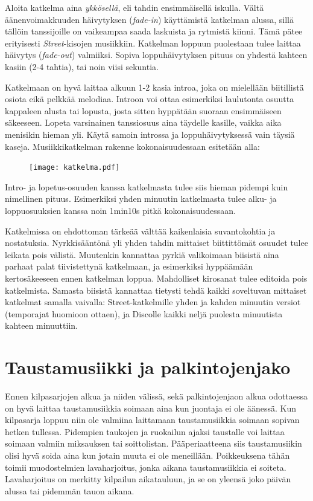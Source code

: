 \documentclass[12pt, a4paper, oneside]{article}
\begin{document}
Aloita katkelma aina \textit{ykkösellä}, eli tahdin ensimmäisellä iskulla.
Vältä äänenvoimakkuuden häivytyksen (\textit{fade-in}) käyttämistä katkelman alussa,
sillä tällöin tanssijoille on vaikeampaa saada laskuista ja rytmistä kiinni.
Tämä pätee erityisesti \textit{Street}-kisojen musiikkiin.
Katkelman loppuun puolestaan tulee laittaa häivytys (\textit{fade-out}) valmiiksi.
Sopiva loppuhäivytyksen pituus on yhdestä kahteen kasiin (2-4 tahtia),
tai noin viisi sekuntia.

Katkelmaan on hyvä laittaa alkuun 1-2 kasia introa,
joka on mielellään biitillistä osiota eikä pelkkää melodiaa.
Introon voi ottaa esimerkiksi laulutonta osuutta kappaleen alusta tai lopusta,
josta sitten hyppätään suoraan ensimmäiseen säkeeseen.
Lopeta varsinainen tanssiosuus aina täydelle kasille,
vaikka aika menisikin hieman yli.
Käytä samoin introssa ja loppuhäivytyksessä vain täysiä kaseja.
Musiikkikatkelman rakenne kokonaisuudessaan esitetään alla: \\

\begin{figure}[ht]
    \centering
    \texttt{[image: katkelma.pdf]}
\end{figure}

Intro- ja lopetus-osuuden kanssa katkelmasta tulee siis hieman pidempi kuin nimellinen pituus.
Esimerkiksi yhden minuutin katkelmasta tulee alku- ja loppuosuuksien kanssa noin 1min10s pitkä kokonaisuudessaan.

Katkelmissa on ehdottoman tärkeää välttää kaikenlaisia suvantokohtia ja nostatuksia.
Nyrkkisääntönä yli yhden tahdin mittaiset biittittömät osuudet tulee leikata pois välistä.
Muutenkin kannattaa pyrkiä valikoimaan biisistä aina parhaat palat tiivistettynä katkelmaan,
ja esimerkiksi hyppäämään kertosäkeeseen ennen katkelman loppua.
Mahdolliset kirosanat tulee editoida pois katkelmista.
Samasta biisistä kannattaa tietysti tehdä kaikki soveltuvan mittaiset katkelmat samalla vaivalla: Street-katkelmille yhden ja kahden minuutin versiot (temporajat huomioon ottaen),
ja Discolle kaikki neljä puolesta minuutista kahteen minuuttiin.

\section{Taustamusiikki ja palkintojenjako} \label{tausta_musa}

Ennen kilpasarjojen alkua ja niiden välissä,
sekä palkintojenjaon alkua odottaessa on hyvä laittaa taustamusiikkia soimaan aina kun juontaja ei ole äänessä.
Kun kilpasarja loppuu niin ole valmiina laittamaan taustamusiikkia soimaan sopivan hetken tullessa.
Pidempien taukojen ja ruokailun ajaksi taustalle voi laittaa soimaan valmiin miksauksen tai soittolistan.
Pääperiaatteena siis taustamusiikin olisi hyvä soida aina kun jotain muuta ei ole meneillään.
Poikkeuksena tähän toimii muodostelmien lavaharjoitus,
jonka aikana taustamusiikkia ei soiteta.
Lavaharjoitus on merkitty kilpailun aikatauluun,
ja se on yleensä joko päivän alussa tai pidemmän tauon aikana.
\end{document}

